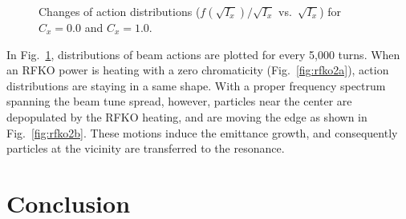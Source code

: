 \documentclass[aps,prstab,onecolumn,preprint]{revtex4-1}
\begin{document}
\begin{figure}[!tbp]
  \caption{\label{fig:rfko2}Changes of action distributions ($f(\sqrt{I_{x}}) / \sqrt{I_{x}}$ vs.~$\sqrt{I_{x}}$) for $C_{x} = 0.0$ and $C_{x} = 1.0$.}
\end{figure}

In Fig.~\ref{fig:rfko2}, distributions of beam actions are plotted for every 5,000 turns. When an RFKO power is heating with a zero chromaticity (Fig.~\ref{fig:rfko2a}), action distributions are staying in a same shape. With a proper frequency spectrum spanning the beam tune spread, however, particles near the center are depopulated by the RFKO heating, and are moving the edge as shown in Fig.~\ref{fig:rfko2b}. These motions induce the emittance growth, and consequently particles at the vicinity are transferred to the resonance.


\section{\label{sec:conclusion}Conclusion}
\end{document}
